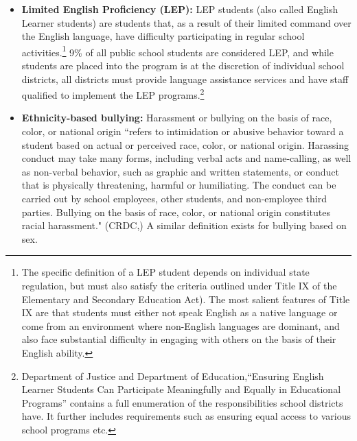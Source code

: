 \documentclass[11pt]{article}
\begin{document}
\begin{itemize}

\item \textbf{Limited English Proficiency (LEP):} LEP students (also called English Learner students) are students that, as a result of their limited command over the English language, have difficulty participating in regular school activities.\footnote{The specific definition of a LEP student depends on individual state regulation, but must also satisfy the criteria outlined under Title IX of the Elementary and Secondary Education Act). The most salient features of Title IX are that students must either not speak English as a native language or come from an environment where non-English languages are dominant, and also face substantial difficulty in engaging with others on the basis of their English ability.} 9\% of all public school students are considered LEP, and while students are placed into the program is at the discretion of individual school districts, all districts must provide language assistance services and have staff qualified to implement the LEP programs.\footnote{ Department of Justice and Department of Education,``Ensuring English Learner Students Can Participate Meaningfully and Equally in Educational Programs'' contains a full enumeration of the responsibilities school districts have. It further includes requirements such as ensuring equal access to various school programs etc. } 

\item \textbf{Ethnicity-based bullying:} Harassment or bullying on the basis of race, color, or national origin ``refers to intimidation or abusive behavior toward a student based on actual or perceived race, color, or national origin. Harassing conduct may take many forms, including verbal acts and name-calling, as well as non-verbal behavior, such as graphic and written statements, or conduct that is physically threatening, harmful or humiliating. The conduct can be carried out by school employees, other students, and non-employee third parties. Bullying on the basis of race, color, or national origin constitutes racial harassment." (CRDC,\cite{noauthor_master_2016}) A similar definition exists for bullying based on sex.

\end{itemize}
\end{document}
